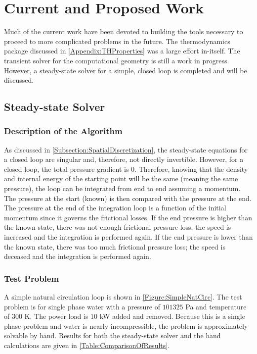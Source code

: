 \chapter{Current and Proposed Work}

Much of the current work have been devoted to building the tools necessary to proceed to more complicated problems in the future.
The thermodynamics package discussed in \cref{Appendix:THProperties} was a large effort in-itself.
The transient solver for the computational geometry is still a work in progress.
However, a steady-state solver for a simple, closed loop is completed and will be discussed.

\section{Steady-state Solver}\label{Section:SSSolver}

\subsection{Description of the Algorithm}
As discussed in \cref{Subsection:SpatialDiscretization}, the steady-state equations for a closed loop are singular and, therefore, not directly invertible.
However, for a closed loop, the total pressure gradient is $0$.
Therefore, knowing that the density and internal energy of the starting point will be the same (meaning the same pressure), the loop can be integrated from end to end assuming a momentum.
The pressure at the start (known) is then compared with the pressure at the end.
The pressure at the end of the integration loop is a function of the initial momentum since it governs the frictional losses.
If the end pressure is higher than the known state, there was not enough frictional pressure loss; the speed is increased and the integration is performed again.
If the end pressure is lower than the known state, there was too much frictional pressure loss; the speed is deceased and the integration is performed again.

\subsection{Test Problem}
A simple natural circulation loop is shown in \cref{Figure:SimpleNatCirc}.
The test problem is for single phase water with a pressure of $101325$ Pa and temperature of $300$ K.
The power load is $10$ kW added and removed.
Because this is a single phase problem and water is nearly incompressible, the problem is approximately solvable by hand.
Results for both the steady-state solver and the hand calculations are given in \cref{Table:ComparisonOfResults}.

